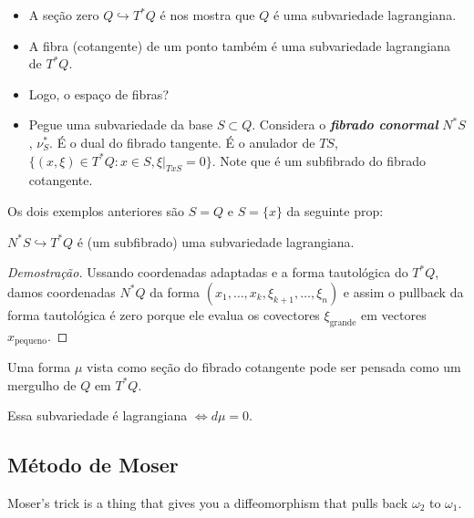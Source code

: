 \begin{example}\leavevmode 
	\begin{itemize}
		\item A se\c c\~ao zero $Q\hookrightarrow T^*Q$ \'e nos mostra que $Q$ \'e uma subvariedade lagrangiana.

		\item A fibra (cotangente) de um ponto tamb\'em \'e uma subvariedade lagrangiana de $T^*Q$.

		\item Logo, o espaço de fibras?

		\item Pegue uma subvariedade da base $S\subset Q$. Considera o \textit{\textbf{fibrado conormal}} $N^*S$, $\nu_S^*$. \'E o dual do fibrado tangente. \'E o anulador de $TS$,  $\{(x,\xi)\in T^*Q:x\in S, \xi|_{TxS}=0\}$. Note que \'e um subfibrado do fibrado cotangente.
	\end{itemize}
\end{example}

Os dois exemplos anteriores s\~ao $S=Q$ e  $S=\{x\}$ da seguinte prop:

\begin{prop}
	$N^*S\hookrightarrow T^*Q$ \'e (um subfibrado) uma subvariedade lagrangiana.
\end{prop}

\begin{proof}[Demostra\c c\~ao]
	Ussando coordenadas adaptadas e a forma tautol\'ogica do $T^*Q$, damos coordenadas $N^*Q$ da forma $(x_1,\ldots,x_k,\xi_{k+1},\ldots,\xi_n)$ e assim o pullback da forma tautol\'ogica \'e zero porque ele evalua os covectores $\xi_{\text{grande} }$ em vectores $x_{\text{pequeno} }$.
\end{proof}

\begin{example}
	Uma forma $\mu$ vista como se\c c\~ao do fibrado cotangente pode ser pensada como um mergulho de $Q$ em $T^*Q$.
\end{example}

\begin{prop}
	Essa subvariedade \'e lagrangiana $\iff d\mu=0$.
\end{prop}

\subsection{M\'etodo de Moser}

\begin{upshot}
	Moser's trick is a thing that gives you a diffeomorphism that pulls back $\omega_2$ to $\omega_1$.
\end{upshot}

